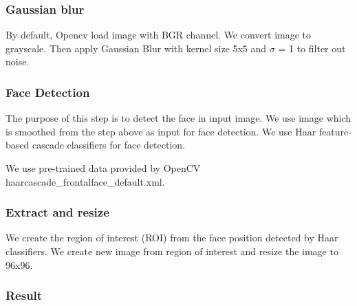 \documentclass[a4paper, 12pt]{article}
\begin{document}
\subsubsection{Gaussian blur}
\label{sec:preprocessing_blur}
By default, Opencv load image with BGR channel. We convert image to grayscale. Then apply Gaussian Blur with kernel size 5x5 and $\sigma$ = 1 to filter out noise.

\subsubsection{Face Detection}
\label{sec:preprocessing_face_detect}
The purpose of this step is to detect the face in input image. We use image which is smoothed from the step above as input for face detection. We use Haar feature-based cascade classifiers \cite{viola2001rapid} for face detection.

We use pre-trained data provided by OpenCV \cite{bradski2000opencv} haarcascade\_frontalface\_default.xml. 

\subsubsection{Extract and resize}
\label{sec:preprocessing_resize}
We create the region of interest (ROI) from the face position detected by Haar classifiers. We create new image from region of interest and resize the image to 96x96.

\subsubsection{Result}
\end{document}
